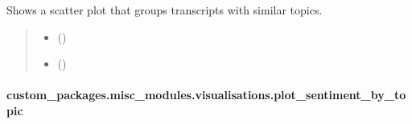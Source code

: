\documentclass[letterpaper,10pt,english]{sphinxhowto}
\begin{document}
\begin{fulllineitems}
\label{\detokenize{_autosummary/custom_packages.misc_modules.visualisations.plot_topic_clusters:custom_packages.misc_modules.visualisations.plot_topic_clusters}}
\pysigstartsignatures
\pysiglinewithargsret
{}
{\sphinxparamcomma {}}
{}
\pysigstopsignatures
\sphinxAtStartPar
Shows a scatter plot that groups transcripts with similar topics.
\begin{quote}\begin{description}
\begin{itemize}
\item {} 
\sphinxAtStartPar
{} ()

\item {} 
\sphinxAtStartPar
{} ()

\end{itemize}

\sphinxAtStartPar
{}

\end{description}\end{quote}

\end{fulllineitems}


\sphinxstepscope


\paragraph{custom\_packages.misc\_modules.visualisations.plot\_sentiment\_by\_topic}
\label{\detokenize{_autosummary/custom_packages.misc_modules.visualisations.plot_sentiment_by_topic:custom-packages-misc-modules-visualisations-plot-sentiment-by-topic}}\label{\detokenize{_autosummary/custom_packages.misc_modules.visualisations.plot_sentiment_by_topic::doc}}
\end{document}

